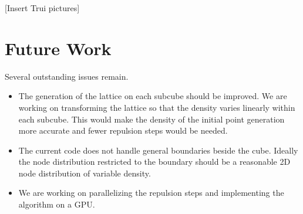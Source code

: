 \documentclass[10pt]{amsart}
\begin{document}
[Insert Trui pictures]





\section{Future Work}

Several outstanding issues remain. 
\begin{itemize}
\item The generation of the lattice on each subcube should be improved. We are working on transforming the lattice so that the density varies linearly within each subcube. This would make the density of the initial point generation more accurate and fewer repulsion steps would be needed.
\item The current code does not handle general boundaries beside the cube. Ideally the node distribution restricted to the boundary should be a reasonable 2D node distribution of variable density.
\item We are working on parallelizing the repulsion steps and implementing the algorithm on a GPU.
\end{itemize}
\end{document}

